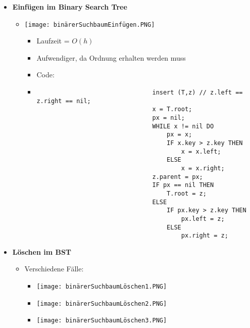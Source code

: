 \begin{itemize}
        \item \textbf{Einfügen im Binary Search Tree}
            \begin{itemize}
                \item[]
                    \begin{minipage}{0.4\textwidth}
                        \texttt{[image: binärerSuchbaumEinfügen.PNG]}
                    \end{minipage}
                    \begin{minipage}{0.5\textwidth}
                        \begin{itemize}
                            \item Laufzeit = $O(h)$
                            \item Aufwendiger, da Ordnung erhalten werden muss
                            \item Code:
                            \item[]
                                \begin{verbatim}
                                insert (T,z) // z.left == z.right == nil;
                                x = T.root;
                                px = nil;
                                WHILE x != nil DO
                                    px = x;
                                    IF x.key > z.key THEN
                                        x = x.left;
                                    ELSE 
                                        x = x.right;
                                z.parent = px;
                                IF px == nil THEN
                                    T.root = z;
                                ELSE 
                                    IF px.key > z.key THEN
                                        px.left = z;
                                    ELSE 
                                        px.right = z;
                                \end{verbatim}
                        \end{itemize}
                    \end{minipage}
            \end{itemize}

\pagebreak

        \item \textbf{Löschen im BST}
            \begin{itemize}
                \item Verschiedene Fälle:
                    \begin{itemize}
                        \item[] \texttt{[image: binärerSuchbaumLöschen1.PNG]}
                        \item[] \texttt{[image: binärerSuchbaumLöschen2.PNG]} 
                        \item[] \texttt{[image: binärerSuchbaumLöschen3.PNG]} 
                    \end{itemize}


\end{itemize}
\end{itemize}
